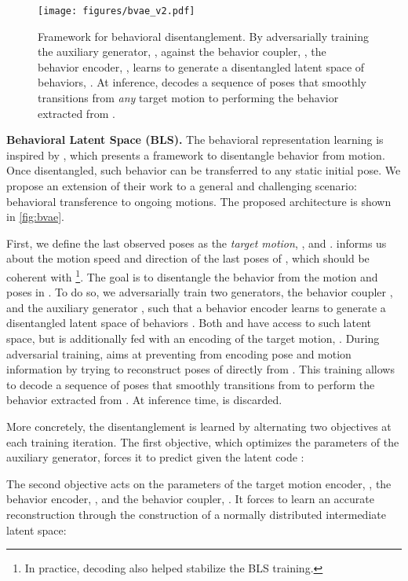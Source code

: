 \documentclass[10pt,twocolumn,letterpaper]{article}
\begin{document}
\begin{figure}[t]
    \centering
    \texttt{[image: figures/bvae\_v2.pdf]}
    \vspace{-0.5cm}
    \caption{Framework for behavioral disentanglement. By adversarially training the auxiliary generator, , against the behavior coupler, , the behavior encoder, , learns to generate a disentangled latent space of behaviors, . At inference,  decodes a sequence of poses that smoothly transitions from \textit{any} target motion  to performing the behavior extracted from .}
    \label{fig:bvae}
    \vspace{-0.5cm}
\end{figure}

\textbf{Behavioral Latent Space (BLS).} The behavioral representation learning is inspired by \cite{blattmann2021behavior}, which presents a framework to disentangle behavior from motion. Once disentangled, such behavior can be transferred to any static initial pose. We propose an extension of their work to a general and challenging scenario: behavioral transference to ongoing motions. The proposed architecture is shown in \autoref{fig:bvae}.

First, we define the last  observed poses as the \textit{target motion}, , and .   informs us about the motion speed and direction of the last poses of , which should be coherent with \footnote{In practice, decoding  also helped stabilize the BLS training.}. The goal is to disentangle the behavior from the motion and poses in . To do so, we adversarially train two generators, the behavior coupler , and the auxiliary generator , such that a behavior encoder  learns to generate a disentangled latent space of behaviors . Both  and  have access to such latent space, but  is additionally fed with an encoding of the target motion, . During adversarial training,  aims at preventing  from encoding pose and motion information by trying to reconstruct poses of  directly from . This training allows  to decode a sequence of poses that smoothly transitions from  to perform the behavior extracted from . At inference time,  is discarded.

More concretely, the disentanglement is learned by alternating two objectives at each training iteration. The first objective, which optimizes the parameters  of the auxiliary generator, forces it to predict  given the latent code :
\vspace{-0.2cm}


The second objective acts on the parameters of the target motion encoder, , the behavior encoder, , and the behavior coupler, . It forces  to learn an accurate  reconstruction through the construction of a normally distributed intermediate latent space:
\vspace{-0.2cm}
\end{document}
